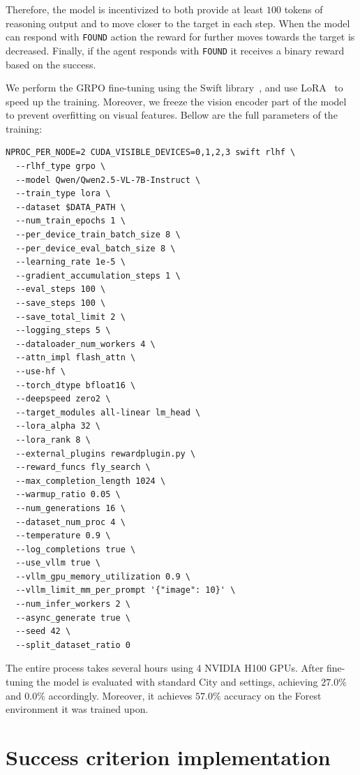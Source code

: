 Therefore, the model is incentivized to both provide at least $100$ tokens of reasoning output and to move closer to the target in each step. When the model can respond with \texttt{FOUND} action the reward for further moves towards the target is decreased. Finally, if the agent responds with \texttt{FOUND} it receives a binary reward based on the success.

We perform the GRPO fine-tuning using the Swift library~\cite{zhao2024swiftascalablelightweightinfrastructure}, and use LoRA~\cite{hu2022lora} to speed up the training. Moreover, we freeze the vision encoder part of the model to prevent overfitting on visual features. Bellow are the full parameters of the training:
\begin{lstlisting}[caption=GRPO fine-tuning command.,label={lst:paramsgrpo}]
NPROC_PER_NODE=2 CUDA_VISIBLE_DEVICES=0,1,2,3 swift rlhf \
  --rlhf_type grpo \
  --model Qwen/Qwen2.5-VL-7B-Instruct \
  --train_type lora \
  --dataset $DATA_PATH \
  --num_train_epochs 1 \
  --per_device_train_batch_size 8 \
  --per_device_eval_batch_size 8 \
  --learning_rate 1e-5 \
  --gradient_accumulation_steps 1 \
  --eval_steps 100 \
  --save_steps 100 \
  --save_total_limit 2 \
  --logging_steps 5 \
  --dataloader_num_workers 4 \
  --attn_impl flash_attn \
  --use-hf \
  --torch_dtype bfloat16 \
  --deepspeed zero2 \
  --target_modules all-linear lm_head \
  --lora_alpha 32 \
  --lora_rank 8 \
  --external_plugins rewardplugin.py \
  --reward_funcs fly_search \
  --max_completion_length 1024 \
  --warmup_ratio 0.05 \
  --num_generations 16 \
  --dataset_num_proc 4 \
  --temperature 0.9 \
  --log_completions true \
  --use_vllm true \
  --vllm_gpu_memory_utilization 0.9 \
  --vllm_limit_mm_per_prompt '{"image": 10}' \
  --num_infer_workers 2 \
  --async_generate true \
  --seed 42 \
  --split_dataset_ratio 0
\end{lstlisting}
The entire process takes several hours using 4 NVIDIA H100 GPUs. After fine-tuning the model is evaluated with standard \challenge{} City and \hardchallenge{} settings, achieving $27.0\%$ and $0.0\%$ accordingly. Moreover, it achieves $57.0\%$ accuracy on the Forest environment it was trained upon.

\section{Success criterion implementation}
\label{sec:success_impl}

